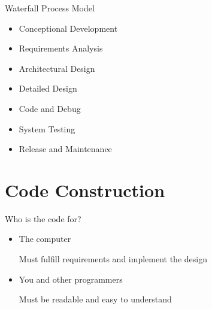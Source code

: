\documentclass[12pt]{article}
\begin{document}
Waterfall Process Model
\begin{itemize}
    \item Conceptional Development
    \item Requirements Analysis
    \item Architectural Design
    \item Detailed Design
    \item Code and Debug
    \item System Testing 
    \item Release and Maintenance
\end{itemize}

\section{Code Construction}

Who is the code for?
\begin{itemize}
    \item The computer
    
    Must fulfill requirements and implement the design

    \item You and other programmers
    
    Must be readable and easy to understand 
\end{itemize}
\end{document}
